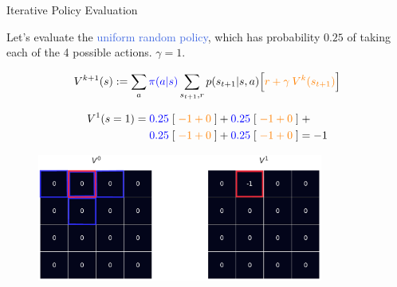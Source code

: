 \documentclass{beamer}
\begin{document}
\begin{frame}{Iterative Policy Evaluation}


\begin{footnotesize}
Let's evaluate the \textcolor{RoyalBlue}{uniform random policy}, which has probability $0.25$ of taking each of the 4 possible actions. $\gamma = 1$.

\begin{align*}
    V^{k+1}(s) := \sum_a \textcolor{blue}{\pi(a|s)} \sum_{s_{t+1},r} p(s_{t+1}|s,a)\Big[\textcolor{orange}{r+\gamma\:V^k(s_{t+1})}\Big]
\end{align*}

\begin{align*}
    V^1(s = 1) = \; &\textcolor{blue}{0.25} \; [\;\textcolor{orange}{-1 + 0}\; ] + \textcolor{blue}{0.25} \; [\;\textcolor{orange}{-1+0}\; ]\; + \\
    &\textcolor{blue}{0.25} \; [\;\textcolor{orange}{-1+0}\; ] + \textcolor{blue}{0.25} \; [\;\textcolor{orange}{-1+0}\; ] = -1
\end{align*}

\end{footnotesize}

\begin{figure}[t]
\includegraphics[width=9.4cm]{./images/step00.png}
\centering
\end{figure}

\end{frame}
\end{document}
